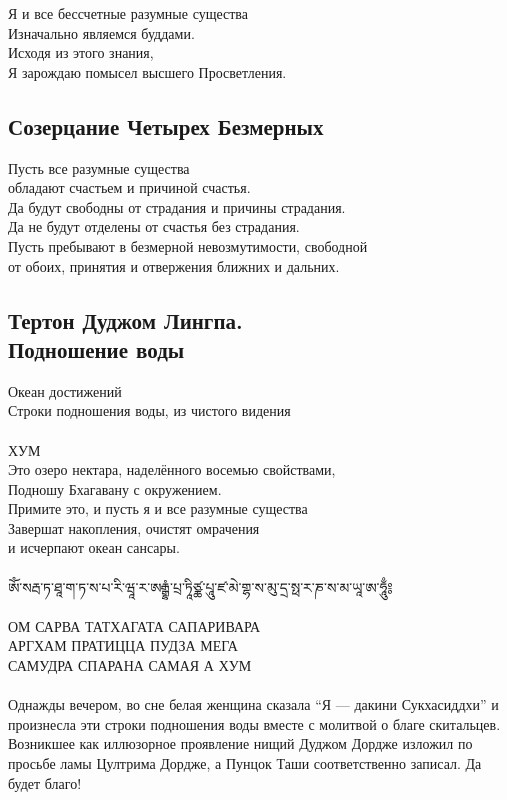 Я и все бессчетные разумные существа\\
Изначально являемся буддами.\\
Исходя из этого знания,\\
Я зарождаю помысел высшего Просветления.\\
\normalsize
\subsection{Созерцание Четырех Безмерных}

Пусть все разумные существа \\ \indent обладают счастьем и причиной счастья.\\
Да будут свободны от страдания и причины страдания.\\
Да не будут отделены от счастья без страдания.\\
Пусть пребывают в безмерной невозмутимости, свободной \\ \indent
 от обоих, принятия и отвержения ближних и дальних.

\newpage %
\subsection{Тертон Дуджом Лингпа.\\Подношение воды}

\large Океан достижений \\
\normalsize Строки подношения воды, из чистого видения\\
\\
ХУМ\\
Это озеро нектара, наделённого восемью свойствами,\\
Подношу Бхагавану с окружением.\\
Примите это, и пусть я и все разумные существа\\
Завершат накопления, очистят омрачения \\ \indent и исчерпают океан сансары.\\
\\
\ti
ཨོཾ་སརྦ་ཏ་ཐཱ་ག་ཏ་ས་པ་རི་ཝཱ་ར་ཨརྒྷཾ་པྲ་ཏཱིཙྪ་པཱུ་ཛ་མེ་གྷ་ས་མུ་དྲ་སྥ་ར་ཎ་ས་མ་ཡཱ་ཨ་ཧཱུྃ༔\\
\\
\ru
ОМ САРВА ТАТХАГАТА САПАРИВАРА\\
АРГХАМ ПРАТИЦЦА ПУДЗА МЕГА \\
САМУДРА СПАРАНА САМАЯ А ХУМ\\
\\
\scriptsize
Однажды вечером, во сне белая женщина сказала “Я — дакини Сукхасиддхи”
и произнесла эти строки подношения воды вместе с молитвой о благе скитальцев.
Возникшее как иллюзорное проявление нищий Дуджом Дордже изложил
по просьбе ламы Цултрима Дордже, а Пунцок Таши соответственно записал.
Да будет благо!\normalsize


